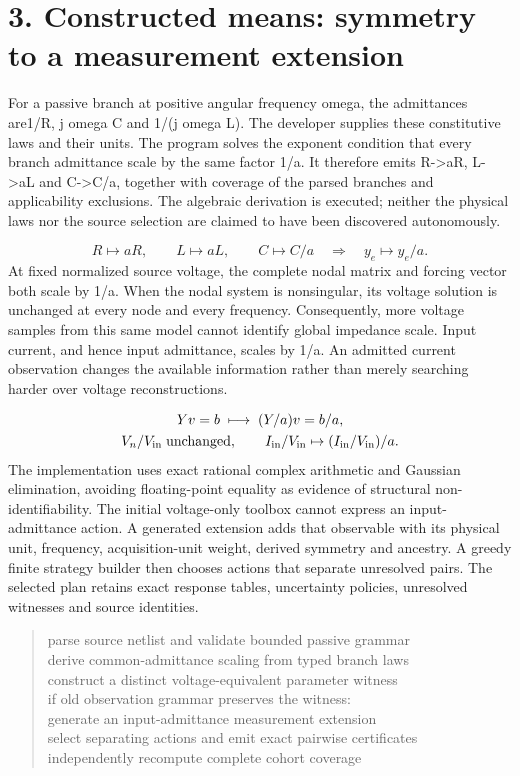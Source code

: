 \documentclass[10pt,letterpaper]{article}
\begin{document}
\section*{\color{accent}3. Constructed means: symmetry to a measurement extension}
For a passive branch at positive angular frequency omega, the admittances are1/R, j omega C and 1/(j omega L). The developer supplies these constitutive laws and their units. The program solves the exponent condition that every branch admittance scale by the same factor 1/a. It therefore emits R->aR, L->aL and C->C/a, together with coverage of the parsed branches and applicability exclusions. The algebraic derivation is executed; neither the physical laws nor the source selection are claimed to have been discovered autonomously.\par
\[ R\mapsto aR,\qquad L\mapsto aL,\qquad C\mapsto C/a\quad\Longrightarrow\quad y_e\mapsto y_e/a. \]
At fixed normalized source voltage, the complete nodal matrix and forcing vector both scale by 1/a. When the nodal system is nonsingular, its voltage solution is unchanged at every node and every frequency. Consequently, more voltage samples from this same model cannot identify global impedance scale. Input current, and hence input admittance, scales by 1/a. An admitted current observation changes the available information rather than merely searching harder over voltage reconstructions.\par
\[ \begin{gathered}Yv=b\;\longmapsto\;(Y/a)v=b/a,\\ V_n/V_{\rm in}\;\text{unchanged},\qquad I_{\rm in}/V_{\rm in}\mapsto(I_{\rm in}/V_{\rm in})/a.\end{gathered} \]
The implementation uses exact rational complex arithmetic and Gaussian elimination, avoiding floating-point equality as evidence of structural non-identifiability. The initial voltage-only toolbox cannot express an input-admittance action. A generated extension adds that observable with its physical unit, frequency, acquisition-unit weight, derived symmetry and ancestry. A greedy finite strategy builder then chooses actions that separate unresolved pairs. The selected plan retains exact response tables, uncertainty policies, unresolved witnesses and source identities.\par
\begin{quote}\footnotesize\ttfamily\raggedright parse source netlist and validate bounded passive grammar\\derive common-admittance scaling from typed branch laws\\construct a distinct voltage-equivalent parameter witness\\if old observation grammar preserves the witness:\\    generate an input-admittance measurement extension\\select separating actions and emit exact pairwise certificates\\independently recompute complete cohort coverage\end{quote}
\end{document}
